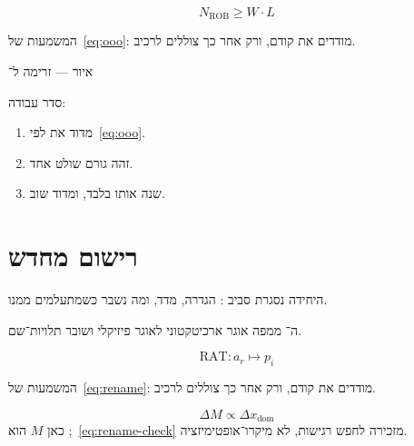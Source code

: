 \begin{equation}
\label{eq:ooo}
N_{\mathrm{ROB}} \ge W\cdot L
\end{equation}

המשמעות של~\eqref{eq:ooo}: מודדים את  קודם, ורק אחר כך צוללים לרכיב.

\begin{tikzpic}
\end{tikzpic}
\begin{center}\small איור — זרימה ל־\end{center}

סדר עבודה:
\begin{enumerate}
\item[(\textbf{א})] מדוד את  לפי~\eqref{eq:ooo}.
\item[(\textbf{ב})] זהה גורם שולט אחד.
\item[(\textbf{ג})] שנה אותו בלבד, ומדוד שוב.
\end{enumerate}

\chapter{רישום מחדש}
\label{ch:rename}

היחידה נסגרת סביב : הגדרה, מדד, ומה נשבר כשמתעלמים ממנו.

\begin{defbox}[frametitle={הגדרה — רישום מחדש}]
ה־ ממפה אוגר ארכיטקטוני לאוגר פיזיקלי ושובר תלויות־שם.
\end{defbox}

\begin{equation}
\label{eq:rename}
\mathrm{RAT}: a_r \mapsto p_i
\end{equation}

המשמעות של~\eqref{eq:rename}: מודדים את  קודם, ורק אחר כך צוללים לרכיב.

\begin{equation}
\label{eq:rename-check}
\Delta M \propto \Delta x_{\mathrm{dom}}
\end{equation}
כאן $M$ הוא ;~\eqref{eq:rename-check} מזכירה לחפש רגישות, לא מיקרו־אופטימיזציה.

